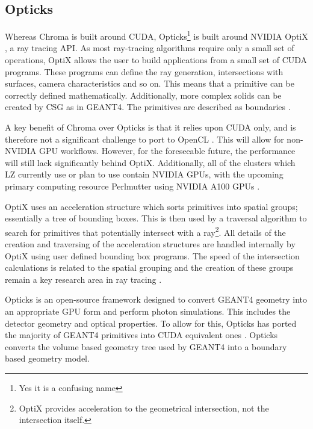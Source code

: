 \subsection{Opticks}
\par
Whereas Chroma is built around CUDA, Opticks\footnote{Yes it is a confusing name} is built around NVIDIA OptiX \cite{nvidia_optix_paper_ref}, a ray tracing API.
As most ray-tracing algorithms require only a small set of operations, OptiX allows the user to build applications from a small set of CUDA programs.
These programs can define the ray generation, intersections with surfaces, camera characteristics and so on.
This means that a primitive can be correctly defined mathematically.
Additionally, more complex solids can be created by CSG as in GEANT4.
The primitives are described as boundaries \cite{real_time_collision_detection_ref}.
\par
A key benefit of Chroma over Opticks is that it relies upon CUDA only, and is therefore not a significant challenge to port to OpenCL \cite{chroma_whitepaper_ref}.
This will allow for non-NVIDIA GPU workflows.
However, for the foreseeable future, the performance will still lack significantly behind OptiX.
Additionally, all of the clusters which LZ currently use or plan to use contain NVIDIA GPUs, with the upcoming primary computing resource Perlmutter using NVIDIA A100 GPUs \cite{perlmutter_ref}.
\par
OptiX uses an acceleration structure which sorts primitives into spatial groups; essentially a tree of bounding boxes.
This is then used by a traversal algorithm to search for primitives that potentially intersect with a ray\footnote{OptiX provides acceleration to the geometrical intersection, not the intersection itself.}.
All details of the creation and traversing of the acceleration structures are handled internally by OptiX using user defined bounding box programs.
The speed of the intersection calculations is related to the spatial grouping and the creation of these groups remain a key research area in ray tracing \cite{NVIDIA_OptiX_GPU_Ray_Tracing_ACM_paper_ref,accelerated_bvh_ref}.
\par
Opticks is an open-source framework designed to convert GEANT4 geometry into an appropriate GPU form and perform photon simulations.
This includes the detector geometry and optical properties.
To allow for this, Opticks has ported the majority of GEANT4 primitives into CUDA equivalent ones \cite{Opticks_CHEP_2019_ref}.
Opticks converts the volume based geometry tree used by GEANT4 into a boundary based geometry model.
